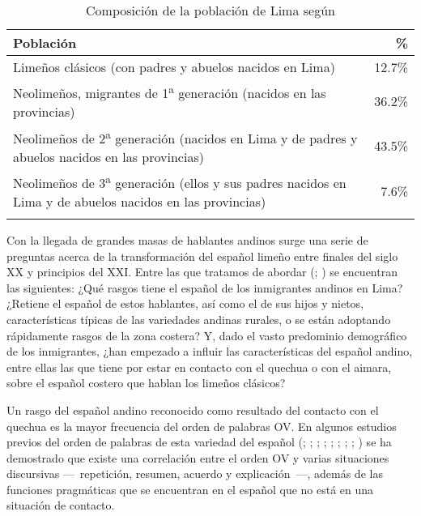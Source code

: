 \documentclass[output=paper]{langscibook}
\begin{document}
\begin{table}
\caption{\label{tab:klee:1}Composición de la población de Lima según  \citet{ArellanoBurgos2004}}

\begin{tabularx}{\textwidth}{Xr}
\lsptoprule
{Población} & {\%}\\
\midrule
{Limeños clásicos (con padres y abuelos nacidos en Lima)}  & {12.7\%}\\
{Neolimeños, migrantes de 1\textsuperscript{a} generación (nacidos en las provincias)} & {36.2\%}\\
{Neolimeños de 2\textsuperscript{a} generación (nacidos en Lima y de padres y abuelos nacidos en las provincias)}  & {43.5\%}\\
{Neolimeños de 3\textsuperscript{a} generación (ellos y sus padres nacidos en Lima y de abuelos nacidos en las provincias)}  & {  7.6\%}\\
\lspbottomrule
\end{tabularx}
\end{table}

Con la llegada de grandes masas de hablantes andinos surge una serie de preguntas acerca de la transformación del español limeño entre finales del siglo XX y principios del XXI. Entre las que tratamos de abordar (\citealt{CaravedoKlee2012}; \citealt{KleeCaravedo2005,KleeCaravedo2006,KleeCaravedo2020,KleeTightCaravedo2011,KleeEtAl2018}) se encuentran las siguientes: ¿Qué rasgos tiene el español de los inmigrantes andinos en Lima? ¿Retiene el español de estos hablantes, así como el de sus hijos y nietos, características típicas de las variedades andinas rurales, o se están adoptando rápidamente rasgos de la zona costera? Y, dado el vasto predominio demográfico de los inmigrantes, ¿han empezado a influir las características del español andino, entre ellas las que tiene por estar en contacto con el quechua o con el aimara, sobre el español costero que hablan los limeños clásicos?

Un rasgo del español andino reconocido como resultado del contacto con el quechua es la mayor frecuencia del orden de palabras OV. En algunos estudios previos del orden de palabras de esta variedad del español (\citealt{Camacho1999}; \citealt{Escobar2000}; \citealt{Klee1996}; \citealt{KleeTightCaravedo2011};  \citealt{LujanMinayaSankoff1984}; \citealt{Mendoza1991}; \citealt{Muntendam2008a,Muntendam2008b}; \citealt{Muysken1984}; \citealt{OcampoKlee1995}) se ha demostrado que existe una correlación  entre el orden OV y varias situaciones discursivas –– repetición, resumen, acuerdo y explicación ––, además de las funciones pragmáticas que se encuentran en el español que no está en una situación de contacto.
\end{document}
